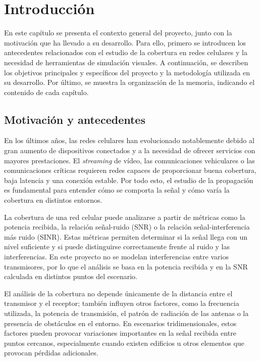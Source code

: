 \chapter{Introducción}
\label{chap:introduccion}

En este capítulo se presenta el contexto general del proyecto, junto con la motivación que ha llevado a su desarrollo. Para ello, primero se introducen los antecedentes relacionados con el estudio de la cobertura en redes celulares y la necesidad de herramientas de simulación visuales. A continuación, se describen los objetivos principales y específicos del proyecto y la metodología utilizada en su desarrollo. Por último, se muestra la organización de la memoria, indicando el contenido de cada capítulo.

\section{Motivación y antecedentes}

En los últimos años, las redes celulares han evolucionado notablemente debido al gran aumento de dispositivos conectados y a la necesidad de ofrecer servicios con mayores prestaciones. El \textit{streaming} de vídeo, las comunicaciones vehiculares o las comunicaciones críticas requieren redes capaces de proporcionar buena cobertura, baja latencia y una conexión estable. Por todo esto, el estudio de la propagación es fundamental para entender cómo se comporta la señal y cómo varía la cobertura en distintos entornos.

La cobertura de una red celular puede analizarse a partir de métricas como la potencia recibida, la relación señal-ruido (SNR) o la relación señal-interferencia más ruido (SINR). Estas métricas permiten determinar si la señal llega con un nivel suficiente y si puede distinguirse correctamente frente al ruido y las interferencias. En este proyecto no se modelan interferencias entre varios transmisores, por lo que el análisis se basa en la potencia recibida y en la SNR calculada en distintos puntos del escenario.

El análisis de la cobertura no depende únicamente de la distancia entre el transmisor y el receptor; también influyen otros factores, como la frecuencia utilizada, la potencia de transmisión, el patrón de radiación de las antenas o la presencia de obstáculos en el entorno. En escenarios tridimensionales, estos factores pueden provocar variaciones importantes en la señal recibida entre puntos cercanos, especialmente cuando existen edificios u otros elementos que provocan pérdidas adicionales.

